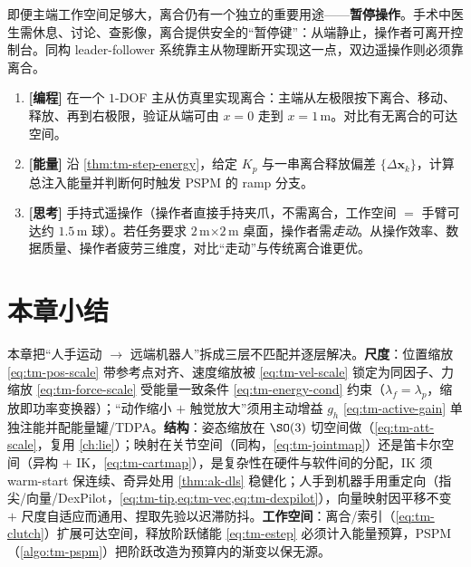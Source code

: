\begin{pitfall}
即便主端工作空间足够大，离合仍有一个独立的重要用途——\textbf{暂停操作}。手术中医生需休息、讨论、查影像，离合提供安全的“暂停键”：从端静止，操作者可离开控制台。同构 leader-follower 系统靠主从物理断开实现这一点，双边遥操作则必须靠离合。
\end{pitfall}

\begin{practice}
\begin{enumerate}
  \item \textbf{[编程]} 在一个 $1$-DOF 主从仿真里实现离合：主端从左极限按下离合、移动、释放、再到右极限，验证从端可由 $x=0$ 走到 $x=1\,$m。对比有无离合的可达空间。
  \item \textbf{[能量]} 沿 \cref{thm:tm-step-energy}，给定 $K_p$ 与一串离合释放偏差 $\{\Delta\mathbf{x}_k\}$，计算总注入能量并判断何时触发 PSPM 的 ramp 分支。
  \item \textbf{[思考]} 手持式遥操作（操作者直接手持夹爪，不需离合，工作空间 $=$ 手臂可达约 $1.5\,$m 球）。若任务要求 $2\,$m$\times 2\,$m 桌面，操作者需\emph{走动}。从操作效率、数据质量、操作者疲劳三维度，对比“走动”与传统离合谁更优。
\end{enumerate}
\end{practice}

\section*{本章小结}

本章把“人手运动 $\to$ 远端机器人”拆成三层不匹配并逐层解决。\textbf{尺度}：位置缩放 \cref{eq:tm-pos-scale} 带参考点对齐、速度缩放被 \cref{eq:tm-vel-scale} 锁定为同因子、力缩放 \cref{eq:tm-force-scale} 受能量一致条件 \cref{eq:tm-energy-cond} 约束（$\lambda_f=\lambda_p$，缩放即功率变换器）；“动作缩小 $+$ 触觉放大”须用主动增益 $g_h$ \cref{eq:tm-active-gain} 单独注能并配能量罐/TDPA。\textbf{结构}：姿态缩放在 $\SO(3)$ 切空间做（\cref{eq:tm-att-scale}，复用 \cref{ch:lie}）；映射在关节空间（同构，\cref{eq:tm-jointmap}）还是笛卡尔空间（异构 $+$ IK，\cref{eq:tm-cartmap}），是复杂性在硬件与软件间的分配，IK 须 warm-start 保连续、奇异处用 \cref{thm:ak-dls} 稳健化；人手到机器手用重定向（指尖/向量/DexPilot，\cref{eq:tm-tip,eq:tm-vec,eq:tm-dexpilot}），向量映射因平移不变 $+$ 尺度自适应而通用、捏取先验以迟滞防抖。\textbf{工作空间}：离合/索引（\cref{eq:tm-clutch}）扩展可达空间，释放阶跃储能 \cref{eq:tm-estep} 必须计入能量预算，PSPM（\cref{algo:tm-pspm}）把阶跃改造为预算内的渐变以保无源。

